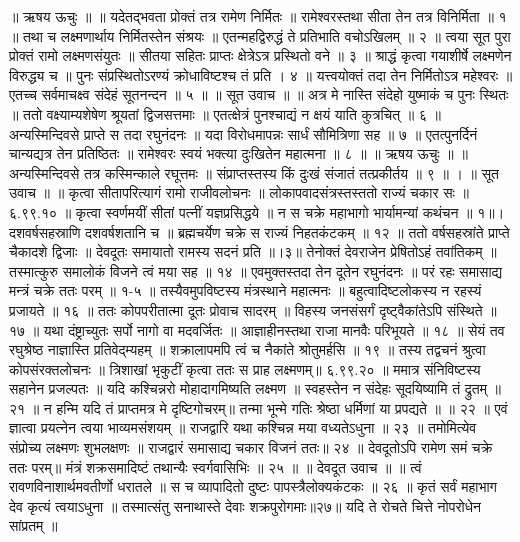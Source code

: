 ॥ ऋषय ऊचुः ॥ ॥
यदेतद्भवता प्रोक्तं तत्र रामेण निर्मितः ॥
रामेश्वरस्तथा सीता तेन तत्र विनिर्मिता ॥ १ ॥
तथा च लक्ष्मणार्थाय निर्मितस्तेन संश्रयः ॥
एतन्महद्विरुद्धं ते प्रतिभाति वचोऽखिलम् ॥ २ ॥
त्वया सूत पुरा प्रोक्तं रामो लक्ष्मणसंयुतः ॥
सीतया सहितः प्राप्तः क्षेत्रेऽत्र प्रस्थितो वने ॥ ३ ॥
श्राद्धं कृत्वा गयाशीर्षे लक्ष्मणेन विरुद्ध्य च ॥
पुनः संप्रस्थितोऽरण्यं क्रोधाविष्टश्च तं प्रति । ४ ॥
यत्त्वयोक्तं तदा तेन निर्मितोऽत्र महेश्वरः ॥
एतच्च सर्वमाचक्ष्व संदेहं सूतनन्दन ॥ ५ ॥
॥ सूत उवाच ॥ ॥
अत्र मे नास्ति संदेहो युष्माकं च पुनः स्थितः ॥
ततो वक्ष्याम्यशेषेण श्रूयतां द्विजसत्तमाः ॥
एतत्क्षेत्रं पुनश्चाद्यं न क्षयं याति कुत्रचित् ॥ ६ ॥
अन्यस्मिन्दिवसे प्राप्ते स तदा रघुनंदनः ॥
यदा विरोधमापन्नः सार्धं सौमित्रिणा सह ॥ ७ ॥
एतत्पुनर्दिनं चान्यद्यत्र तेन प्रतिष्ठितः ॥
रामेश्वरः स्वयं भक्त्या दुःखितेन महात्मना ॥ ८ ॥
॥ ऋषय ऊचुः ॥ ॥
अन्यस्मिन्दिवसे तत्र कस्मिन्काले रघूत्तमः ॥
संप्राप्तस्तस्य किं दुःखं संजातं तत्प्रकीर्तय ॥ ९ ॥ ।
॥ सूत उवाच ॥ ॥
कृत्वा सीतापरित्यागं रामो राजीवलोचनः ॥
लोकापवादसंत्रस्तस्ततो राज्यं चकार सः ॥ ६.९९.१० ॥
कृत्वा स्वर्णमयीं सीतां पत्नीं यज्ञप्रसिद्धये ॥
न स चक्रे महाभागो भार्यामन्यां कथंचन ॥ १॥।
दशवर्षसहस्राणि दशवर्षशतानि च ॥
ब्रह्मचर्येण चक्रे स राज्यं निहतकंटकम् ॥ १२ ॥
ततो वर्षसहस्रांते प्राप्ते चैकादशे द्विजाः ॥
देवदूतः समायातो रामस्य सदनं प्रति ॥।३॥
तेनोक्तं देवराजेन प्रेषितोऽहं तवांतिकम् ॥
तस्मात्कुरु समालोकं विजने त्वं मया सह ॥ १४ ॥
एवमुक्तस्तदा तेन दूतेन रघुनंदनः ॥
परं रहः समासाद्य मन्त्रं चक्रे ततः परम् ॥ १-५ ॥
तस्यैवमुपविष्टस्य मंत्रस्थाने महात्मनः ॥
बहुत्वादिष्टलोकस्य न रहस्यं प्रजायते ॥ १६ ॥
ततः कोपपरीतात्मा दूतः प्रोवाच सादरम् ॥
विहस्य जनसंसर्गं दृष्ट्वैकांतेऽपि संस्थिते ॥ १७ ॥
यथा दंष्ट्राच्युतः सर्पो नागो वा मदवर्जितः ॥
आज्ञाहीनस्तथा राजा मानवैः परिभूयते ॥ १८ ॥
सेयं तव रघुश्रेष्ठ नाज्ञास्ति प्रतिवेद्म्यहम् ॥
शक्रालापमपि त्वं च नैकांते श्रोतुमर्हसि ॥ १९ ॥
तस्य तद्वचनं श्रुत्वा कोपसंरक्तलोचनः ॥
त्रिशाखां भृकुटीं कृत्वा ततः स प्राह लक्ष्मणम्॥ ६.९९.२० ॥
ममात्र संनिविष्टस्य सहानेन प्रजल्पतः ॥
यदि कश्चिन्नरो मोहादागमिष्यति लक्ष्मण ॥
स्वहस्तेन न संदेहः सूदयिष्यामि तं द्रुतम् ॥ २१ ॥
न हन्मि यदि तं प्राप्तमत्र मे दृष्टिगोचरम्॥
तन्मा भून्मे गतिः श्रेष्ठा धर्मिणां या प्रपद्यते ॥ ॥ २२ ॥
एवं ज्ञात्वा प्रयत्नेन त्वया भाव्यमसंशयम् ॥
राजद्वारि यथा कश्चिन्न मया वध्यतेऽधुना ॥ २३ ॥
तमोमित्येव संप्रोच्य लक्ष्मणः शुभलक्षणः ॥
राजद्वारं समासाद्य चकार विजनं ततः॥ २४ ॥
देवदूतोऽपि रामेण समं चक्रे ततः परम्॥
मंत्रं शक्रसमादिष्टं तथान्यैः स्वर्गवासिभिः ॥ २५ ॥
॥ देवदूत उवाच ॥ ॥
त्वं रावणविनाशार्थमवतीर्णो धरातले ॥
स च व्यापादितो दुष्टः पापस्त्रैलोक्यकंटकः ॥ २६ ॥
कृतं सर्वं महाभाग देव कृत्यं त्वयाऽधुना ॥
तस्मात्संतु सनाथास्ते देवाः शक्रपुरोगमाः॥२७॥
यदि ते रोचते चित्ते नोपरोधेन सांप्रतम् ॥
